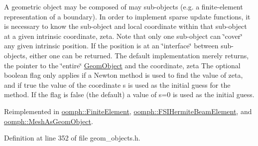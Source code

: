 A geometric object may be composed of may sub-\/objects (e.\+g. a finite-\/element representation of a boundary). In order to implement sparse update functions, it is necessary to know the sub-\/object and local coordinate within that sub-\/object at a given intrinsic coordinate, zeta. Note that only one sub-\/object can \char`\"{}cover\char`\"{} any given intrinsic position. If the position is at an \char`\"{}interface\char`\"{} between sub-\/objects, either one can be returned. The default implementation merely returns, the pointer to the \char`\"{}entire\char`\"{} \hyperlink{classoomph_1_1GeomObject}{Geom\+Object} and the coordinate, zeta The optional boolean flag only applies if a Newton method is used to find the value of zeta, and if true the value of the coordinate s is used as the initial guess for the method. If the flag is false (the default) a value of s=0 is used as the initial guess. 



Reimplemented in \hyperlink{classoomph_1_1FiniteElement_a4dc20a17b1d0e255f917895975cbd15d}{oomph\+::\+Finite\+Element}, \hyperlink{classoomph_1_1FSIHermiteBeamElement_ae56f8245dbbb641c98d326780ff9400d}{oomph\+::\+F\+S\+I\+Hermite\+Beam\+Element}, and \hyperlink{classoomph_1_1MeshAsGeomObject_a8a9fecb98d4e0a151e3b9e58aa433be9}{oomph\+::\+Mesh\+As\+Geom\+Object}.



Definition at line 352 of file geom\+\_\+objects.\+h.



